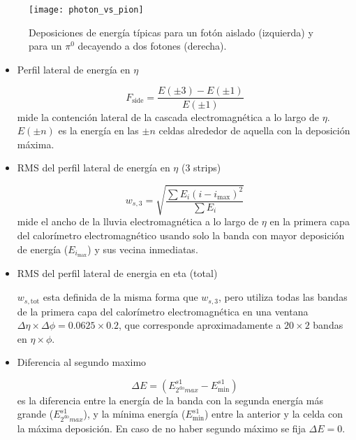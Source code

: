 \begin{figure}[!htb]
  \centering

  \texttt{[image: photon\_vs\_pion]}

  \caption{Deposiciones de energía típicas para un fotón aislado (izquierda) y para un $\pi^0$ decayendo a dos fotones (derecha).}
  \label{fig:photon_pi0}
\end{figure}




\begin{itemize}\itemsep0.2cm\parskip0.2cm
\item Perfil lateral de energía en $\eta$

  \begin{equation}
    F_\mathrm{side} = \frac{E(\pm 3) - E(\pm 1)}{E(\pm 1)}
  \end{equation}
  mide la contención lateral de la cascada electromagnética a lo largo de $\eta$.
  $E(\pm n)$ es la energía en las $\pm n$ celdas alrededor de aquella con la deposición máxima.

\item RMS del perfil lateral de energía en $\eta$ (3 strips)

  \begin{equation}
    w_{s,3} = \sqrt{ \frac{\sum E_i (i - i_\mathrm{max})^2}{\sum E_i} }
  \end{equation}
  mide el ancho de la lluvia electromagnética a lo largo de $\eta$ en la primera capa
  del calorímetro electromagnético usando solo la banda con mayor deposición de energía ($E_{i_\mathrm{max}}$)
  y sus vecina inmediatas.

\item RMS del perfil lateral de energia en eta (total)

  $w_{s,\mathrm{tot}}$ esta definida de la misma forma que $w_{s,3}$, pero utiliza todas las bandas de la
  primera capa del calorímetro electromagnética en una ventana $\Delta\eta \times \Delta\phi = 0.0625 \times 0.2$,
  que corresponde aproximadamente a $20 \times 2$ bandas en $\eta \times \phi$.

\item Diferencia al segundo maximo

  \begin{equation}
    \Delta E = (E^{s1}_{2^{\mathrm{do}} max} - E_\mathrm{min}^{s1} )
  \end{equation}
  es la diferencia entre la energía de la banda con la segunda energía más grande ($E^{s1}_{2^{\mathrm{do}} max}$),
  y la mínima energía ($E_\mathrm{min}^{s1}$) entre la anterior y la celda con la máxima deposición. En caso
  de no haber segundo máximo se fija $\Delta E = 0$.


\end{itemize}
